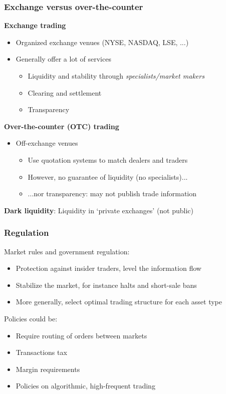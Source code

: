 \documentclass[english,10pt]{beamer}
\theoremstyle{definition}
\begin{document}
\begin{frame}
\frametitle{Exchange versus over-the-counter}

\textbf{Exchange trading}
\begin{itemize}
\item Organized exchange venues (NYSE, NASDAQ, LSE, ...)
\item Generally offer a lot of services
\begin{itemize}
\item Liquidity and stability through \textit{specialists/market makers}
\item Clearing and settlement
\item Transparency
\end{itemize}

\end{itemize}


\textbf{Over-the-counter (OTC) trading}
\begin{itemize}
\item Off-exchange venues
\begin{itemize}
\item Use quotation systems to match dealers and traders
\item However, no guarantee of liquidity (no specialists)...
\item ...nor transparency: may not publish trade information
\end{itemize}

\end{itemize}


\textbf{Dark liquidity}: Liquidity in `private exchanges' (not public)
\end{frame}


\begin{frame}
\frametitle{Regulation}

Market rules and government regulation:
\begin{itemize}

\item Protection against insider traders, level the information flow
\item Stabilize the market, for instance halts and short-sale bans
\item More generally, select optimal trading structure for each asset type
\end{itemize}

Policies could be:

\begin{itemize}
\item Require routing of orders between markets
\item Transactions tax
\item Margin requirements
\item Policies on algorithmic, high-frequent trading
\end{itemize}

\end{frame}
\end{document}
